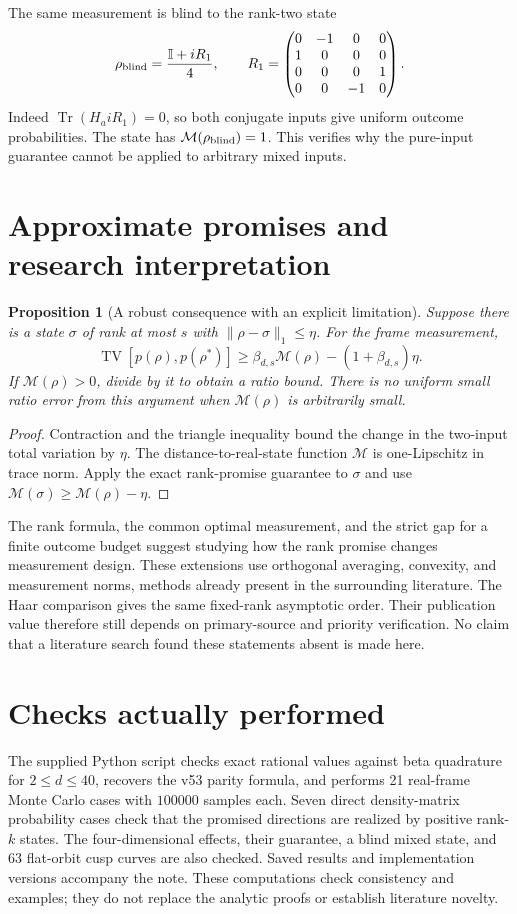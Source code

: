 \documentclass[11pt]{article}
\newtheorem{proposition}{Proposition}
\newcommand{\Tr}{\operatorname{Tr}}
\newcommand{\TV}{\operatorname{TV}}
\newcommand{\M}{\mathcal M}
\newcommand{\Id}{\mathbb I}
\begin{document}
The same measurement is blind to the rank-two state
\[
\rho_{\rm blind}=\frac{\Id+iR_1}{4},\qquad
R_1=\begin{pmatrix}0&-1&0&0\\1&0&0&0\\0&0&0&1\\0&0&-1&0\end{pmatrix}.
\]
Indeed $\Tr(H_a iR_1)=0$, so both conjugate inputs give uniform
outcome probabilities. The state has $\M(\rho_{\rm blind})=1$.
This verifies why the pure-input guarantee cannot be applied to
arbitrary mixed inputs.

\section{Approximate promises and research interpretation}
\begin{proposition}[A robust consequence with an explicit limitation]
Suppose there is a state $\sigma$ of rank at most $s$ with
$\|\rho-\sigma\|_1\leq\eta$. For the frame measurement,
\[
\TV[p(\rho),p(\rho^*)]
\geq\beta_{d,s}\M(\rho)-(1+\beta_{d,s})\eta.
\]
If $\M(\rho)>0$, divide by it to obtain a ratio bound. There is
no uniform small ratio error from this argument when
$\M(\rho)$ is arbitrarily small.
\end{proposition}
\begin{proof}
Contraction and the triangle inequality bound the change in the
two-input total variation by $\eta$.
The distance-to-real-state function $\M$ is one-Lipschitz in trace
norm. Apply the exact rank-promise guarantee to $\sigma$ and use
$\M(\sigma)\geq\M(\rho)-\eta$.
\end{proof}

The rank formula, the common optimal measurement, and the strict
gap for a finite outcome budget suggest studying how the rank
promise changes measurement design. These extensions use orthogonal
averaging, convexity, and measurement norms, methods already present
in the surrounding literature.
The Haar comparison gives the same fixed-rank asymptotic order.
Their publication value therefore still depends on primary-source
and priority verification. No claim that a literature search found
these statements absent is made here.

\section{Checks actually performed}
The supplied Python script checks exact rational values against
beta quadrature for $2\leq d\leq40$, recovers the v53 parity formula,
and performs 21 real-frame Monte Carlo cases with $100000$ samples
each. Seven direct density-matrix probability cases check that the
promised directions are realized by positive rank-$k$ states.
The four-dimensional effects, their guarantee, a blind mixed state,
and 63 flat-orbit cusp curves are also checked.
Saved results and implementation versions accompany the note.
These computations check consistency and examples; they do not
replace the analytic proofs or establish literature novelty.
\end{document}
